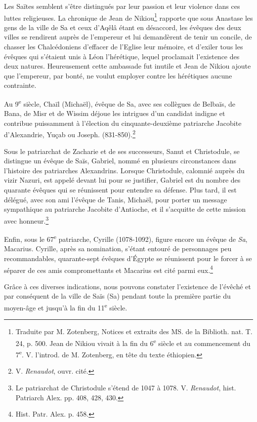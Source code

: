 \documentclass[letterpaper,twocolumn,openany,nodeprecatedcode]{dndbook}
\begin{document}
Les Saïtes semblent s'être distingués par leur passion et leur violence dans ces luttes religieuses. La chronique de Jean de Nikiou\footnote{Traduite par M. Zotenberg, Notices et extraits des MS. de la Biblioth. nat. T. 24, p. 500. Jean de Nikiou vivait à la fin du 6\textsuperscript{e} siècle et au commencement du 7\textsuperscript{e}. V. l'introd. de M. Zotenberg, en tête du texte éthiopien.} rapporte que sous Anastase les gens de la ville de Sa et ceux d'Aqêlâ étant en désaccord, les évêques des deux villes se rendirent auprès de l'empereur et lui demandèrent de tenir un concile, de chasser les Chalcédoniens d'effacer de l'Eglise leur mémoire, et d'exiler tous les évêques qui s'étaient unis à Léon l'hérétique, lequel proclamait l'existence des deux natures. Heureusement cette ambassade fut inutile et Jean de Nikiou ajoute que l'empereur, par bonté, ne voulut employer contre les hérétiques aucune contrainte.

Au 9\textsuperscript{e} siècle, Chaïl (Michaël), évêque de Sa, avec ses collègues de Belbaïs, de Bana, de Misr et de Wissim déjoue les intrigues d'un candidat indigne et contribue puissamment à l'élection du cinquante-deuxième patriarche Jacobite d'Alexandrie, Yuçab ou Joseph. (831-850).\footnote{V. \emph{Renaudot}, ouvr. cité.}

Sous le patriarchat de Zacharie et de ses successeurs, Sanut et Christodule, se distingue un évêque de Saïs, Gabriel, nommé en plusieurs circonstances dans l'histoire des patriarches Alexandrins. Lorsque Christodule, calomnié auprès du vizir Nazuri, est appelé devant lui pour se justifier, Gabriel est du nombre des quarante évêques qui se réunissent pour entendre sa défense. Plus tard, il est délégué, avec son ami l'évêque de Tanis, Michaël, pour porter un message sympathique au patriarche Jacobite d'Antioche, et il s'acquitte de cette mission avec honneur.\footnote{Le patriarchat de Christodule s'étend de 1047 à 1078. V. \emph{Renaudot}, hist. Patriarch Alex. pp. 408, 428, 430.}

Enfin, sous le 67\textsuperscript{e} patriarche, Cyrille (1078-1092), figure encore un évêque de \emph{Sa}, Macarius. Cyrille, après sa nomination, s'étant entouré de personnages peu recommandables, quarante-sept évêques d'Égypte se réunissent pour le forcer à se séparer de ces amis compromettants et Macarius est cité parmi eux.\footnote{Hist. Patr. Alex. p. 458.}

Grâce à ces diverses indications, nous pouvons constater l'existence de l'évêché et par conséquent de la ville de Saïs (Sa) pendant toute la première partie du moyen-âge et jusqu'à la fin du 11\textsuperscript{e} siècle.
\end{document}
